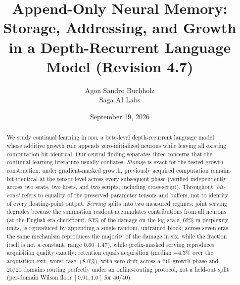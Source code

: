 \documentclass[11pt]{article}
\title{\bfseries Append-Only Neural Memory: Storage, Addressing, and Growth\\ \large in a Depth-Recurrent Language Model \textnormal{(Revision 4.7)}}
\author{Agon Sandro Buchholz\\\small Saga AI Labs}
\date{September 19, 2026}
\theoremstyle{definition}\newtheorem{definition}{Definition}
\theoremstyle{remark}\newtheorem{remark}{Remark}
\newcommand{\BDH}{\textsc{bdh}}
\begin{document}
\maketitle

\begin{abstract}
We study continual learning in \BDH{}, a byte-level depth-recurrent language
model~\cite{bdh} whose additive growth rule appends zero-initialized neurons while leaving all existing computation bit-identical. Our central finding separates three concerns that the continual-learning literature usually conflates.
\emph{Storage} is exact for the tested growth construction: under gradient-masked growth, previously acquired computation remains bit-identical at the tensor level across every subsequent phase (verified independently across two seats, two hosts, and two scripts, including cross-script). Throughout, \emph{bit-exact} refers to equality of the preserved parameter tensors and buffers, not to identity of every floating-point output.
\emph{Serving} splits into two measured regimes: joint serving degrades because the summation readout accumulates contributions from all neurons (at the English-era checkpoint, 83\% of the damage on the log scale, 62\% in perplexity units, is reproduced by appending a single random, untrained block; across seven eras the same mechanism reproduces the majority of the damage in six, while the fraction itself is not a constant, range 0.60--1.47), while prefix-masked serving reproduces acquisition quality exactly: retention equals acquisition (median $+4.3\%$ over the acquisition exit, worst case $+8.0\%$), with zero drift across a full growth phase and 20/20 domains routing perfectly under an online-routing protocol, not a held-out split (per-domain Wilson floor $[0.91,1.0]$ for 40/40).

\end{abstract}
\end{document}
